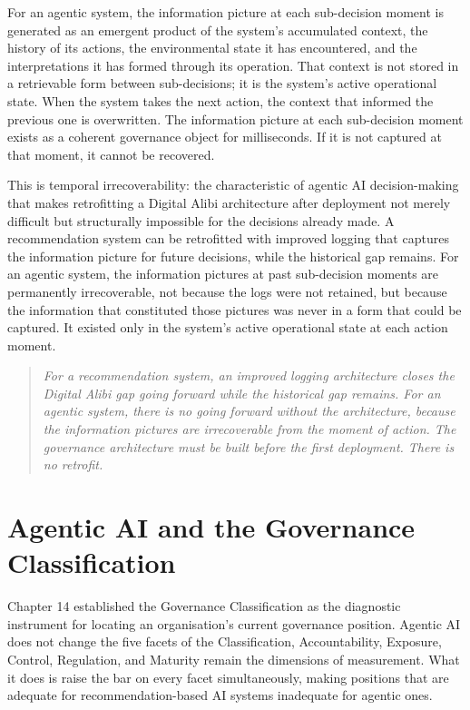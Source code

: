 For an agentic system, the information picture at each sub-decision moment is generated as an emergent product of the system's accumulated context, the history of its actions, the environmental state it has encountered, and the interpretations it has formed through its operation. That context is not stored in a retrievable form between sub-decisions; it is the system's active operational state. When the system takes the next action, the context that informed the previous one is overwritten. The information picture at each sub-decision moment exists as a coherent governance object for milliseconds. If it is not captured at that moment, it cannot be recovered.

This is temporal irrecoverability: the characteristic of agentic AI decision-making that makes retrofitting a Digital Alibi architecture after deployment not merely difficult but structurally impossible for the decisions already made. A recommendation system can be retrofitted with improved logging that captures the information picture for future decisions, while the historical gap remains. For an agentic system, the information pictures at past sub-decision moments are permanently irrecoverable, not because the logs were not retained, but because the information that constituted those pictures was never in a form that could be captured. It existed only in the system's active operational state at each action moment.

\begin{quote}
\emph{For a recommendation system, an improved logging architecture closes the Digital Alibi gap going forward while the historical gap remains. For an agentic system, there is no going forward without the architecture, because the information pictures are irrecoverable from the moment of action. The governance architecture must be built before the first deployment. There is no retrofit.}
\end{quote}

\scenebreak

\section{Agentic AI and the Governance Classification}

Chapter 14 established the Governance Classification as the diagnostic instrument for locating an organisation's current governance position. Agentic AI does not change the five facets of the Classification, Accountability, Exposure, Control, Regulation, and Maturity remain the dimensions of measurement. What it does is raise the bar on every facet simultaneously, making positions that are adequate for recommendation-based AI systems inadequate for agentic ones.

